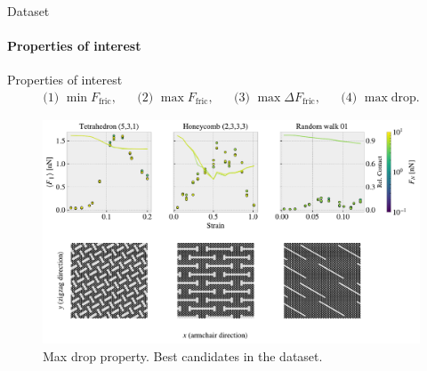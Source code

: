 \documentclass[
	10pt, %
]{beamer}
\begin{document}
%
%
\begin{frame}{Dataset}
	\framesubtitle{Properties of interest}
	Properties of interest
	\begin{align*}
		&\text{(1) } \min F_{\text{fric}},& &\text{(2) } \max F_{\text{fric}},& &\text{(3) } \max \Delta F_{\text{fric}},& &\text{(4) } \max \text{drop}.&
	\end{align*}
	\begin{figure}[H]
		\centering
		\includegraphics[width=0.7\linewidth]{../thesis/figures/stretch_profiles/PP_max_drop.pdf}
		\caption{Max drop property. Best candidates in the dataset.}
	  \end{figure}
\end{frame}
%
%
\end{document}
